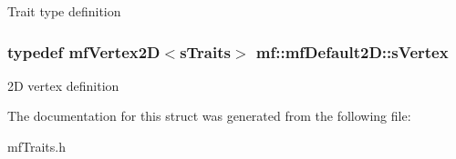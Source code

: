\label{structmf_1_1mfDefault2D_a8139211f36d360a0221d3a8e8221bbce}
Trait type definition \hypertarget{structmf_1_1mfDefault2D_a427f10d57187e5fe16a2b3ae91d18ea2}{
\subsubsection[{sVertex}]{\setlength{\rightskip}{0pt plus 5cm}typedef {\bf mfVertex2D}$<${\bf sTraits}$>$ {\bf mf::mfDefault2D::sVertex}}}
\label{structmf_1_1mfDefault2D_a427f10d57187e5fe16a2b3ae91d18ea2}
2D vertex definition 

The documentation for this struct was generated from the following file:\begin{DoxyCompactItemize}
\item 
mfTraits.h\end{DoxyCompactItemize}
